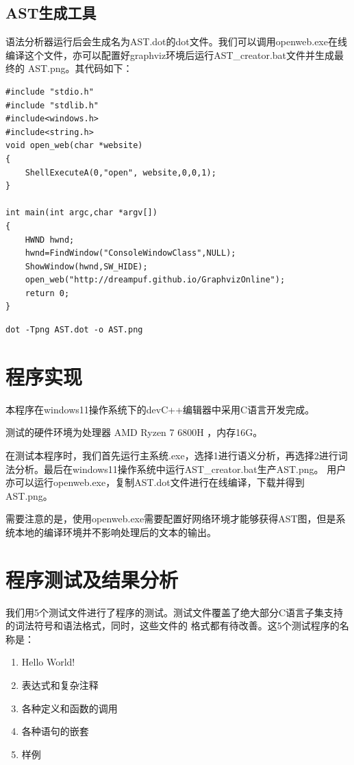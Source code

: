 \documentclass[supercite]{Experimental_Report}
\theoremstyle{definition}
\begin{document}
\subsection{AST生成工具}
语法分析器运行后会生成名为AST.dot的dot文件。我们可以调用openweb.exe在线编译这个文件，亦可以配置好graphviz环境后运行AST\_creator.bat文件并生成最终的
AST.png。其代码如下：
\begin{lstlisting}[title=openweb.exe,frame=none]
#include "stdio.h"  
#include "stdlib.h" 
#include<windows.h> 
#include<string.h>  
void open_web(char *website)
{
	ShellExecuteA(0,"open", website,0,0,1);
}

int main(int argc,char *argv[])   
{ 
	HWND hwnd;  
	hwnd=FindWindow("ConsoleWindowClass",NULL);    
	ShowWindow(hwnd,SW_HIDE);                      
	open_web("http://dreampuf.github.io/GraphvizOnline");
	return 0;  
}
\end{lstlisting}

\begin{lstlisting}[title=AST\_creator.bat,frame=none]
	dot -Tpng AST.dot -o AST.png
\end{lstlisting}
\newpage

\section{程序实现}

本程序在windows11操作系统下的devC++编辑器中采用C语言开发完成。

测试的硬件环境为处理器	AMD Ryzen 7 6800H ，内存16G。

在测试本程序时，我们首先运行主系统.exe，选择1进行语义分析，再选择2进行词法分析。最后在windows11操作系统中运行AST\_creator.bat生产AST.png。
用户亦可以运行openweb.exe，复制AST.dot文件进行在线编译，下载并得到AST.png。

需要注意的是，使用openweb.exe需要配置好网络环境才能够获得AST图，但是系统本地的编译环境并不影响处理后的文本的输出。

\section{程序测试及结果分析}
我们用5个测试文件进行了程序的测试。测试文件覆盖了绝大部分C语言子集支持的词法符号和语法格式，同时，这些文件的
格式都有待改善。这5个测试程序的名称是：
\begin{enumerate}
	\item Hello World!
	\item 表达式和复杂注释
	\item 各种定义和函数的调用
	\item 各种语句的嵌套
	\item 样例
\end{enumerate}
\end{document}
